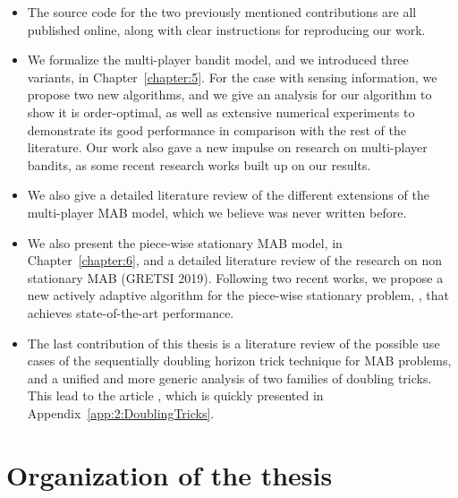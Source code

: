 \begin{itemize}
    \item
    The source code for the two previously mentioned contributions are all published online, along with clear instructions for reproducing our work.

    \item
    We formalize the multi-player bandit model, and we introduced three variants, in Chapter~\ref{chapter:5}.
    For the case with sensing information, we propose two new algorithms, and we give an analysis for our algorithm \MCTopM{} to show it is order-optimal,
    as well as extensive numerical experiments to demonstrate its good performance in comparison with the rest of the literature.
    Our work \cite{Besson2018ALT} also gave a new impulse on research on multi-player bandits, as some recent research works built up on our results.

    \item
    We also give a detailed literature review of the different extensions of the multi-player MAB model, which we believe was never written before.

    \item
    We also present the piece-wise stationary MAB model, in Chapter~\ref{chapter:6}, and a detailed literature review of the research on non stationary MAB \cite{Besson2019GLRT,Besson2019Gretsi} (GRETSI 2019).
    Following two recent works, we propose a new actively adaptive algorithm for the piece-wise stationary problem, \GLRklUCB, that achieves state-of-the-art performance.

    \item
    The last contribution of this thesis is a literature review of the possible use cases of the sequentially doubling horizon trick technique for MAB problems,
    and a unified and more generic analysis of two families of doubling tricks.
    This lead to the article \cite{Besson2018DoublingTricks}, which is quickly presented in Appendix~\ref{app:2:DoublingTricks}.
\end{itemize}


\section{Organization of the thesis}
\label{sec:1:organization}

